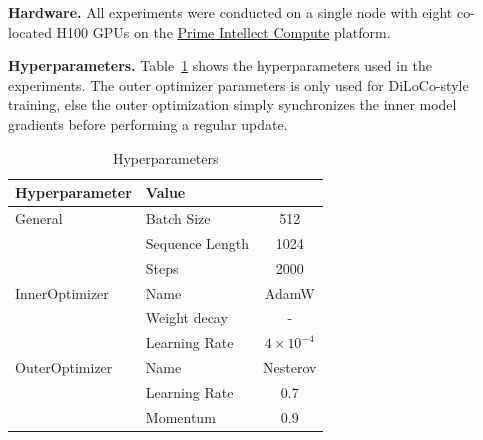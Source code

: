 \documentclass[conference, 10pt]{IEEEtran}
\begin{document}



\appendix

\textbf{Hardware.} All experiments were conducted on a single node with eight
co-located H100 GPUs on the \href{https://app.primeintellect.com/}{Prime
Intellect Compute} platform.

\textbf{Hyperparameters.} Table~\ref{tab:hyperparameters} shows the
hyperparameters used in the experiments. The outer optimizer parameters is only
used for DiLoCo-style training, else the outer optimization simply synchronizes
the inner model gradients before performing a regular update.

\begin{table}[h]
\centering
\begin{tabular}{llc}
\toprule
\textbf{Hyperparameter} & \textbf{Value} \\ 
\midrule
\multirow{1}{*}{General} & Batch Size & 512 \\ 
& Sequence Length & 1024 \\ 
& Steps & 2000 \\
\hline
\multirow{1}{*}{InnerOptimizer} & Name & AdamW \\ 
& Weight decay & - \\ 
& Learning Rate & $4 \times 10^{-4}$ \\ 
\hline
\multirow{1}{*}{OuterOptimizer} & Name & Nesterov \\ 
& Learning Rate & 0.7 \\ 
& Momentum & 0.9 \\ 
\bottomrule
\end{tabular}
\caption{Hyperparameters}
\label{tab:hyperparameters}
\end{table}
\end{document}
